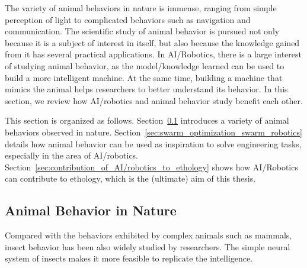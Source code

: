 The variety of animal behaviors in nature is immense, ranging from simple perception of light to complicated behaviors such as navigation and communication. The scientific study of animal behavior is pursued not only because it is a subject of interest in itself, but also because the knowledge gained from it has several practical applications. In AI/Robotics, there is a large interest of studying animal behavior, as the model/knowledge learned can be used to build a more intelligent machine. At the same time, building a machine that mimics the animal helps researchers to better understand its behavior. In this section, we review how AI/robotics and animal behavior study benefit each other. 

This section is organized as follows. Section~\ref{sec:animal_behavior_in_nature} introduces a variety of animal behaviors observed in nature. Section~\ref{sec:swarm_optimization_swarm_robotics} details how animal behavior can be used as inspiration to solve engineering tasks, especially in the area of AI/robotics. Section~\ref{sec:contribution_of_AI/robotics_to_ethology} shows how AI/Robotics can contribute to ethology, which is the (ultimate) aim of this thesis.

\subsection{Animal Behavior in Nature}\label{sec:animal_behavior_in_nature}

Compared with the behaviors exhibited by complex animals such as mammals, insect behavior has been also widely studied by researchers. The simple neural system of insects makes it more feasible to replicate the intelligence. 


